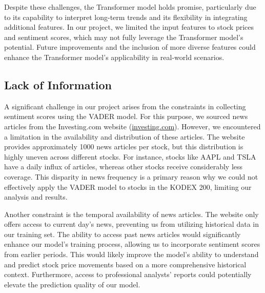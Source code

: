 Despite these challenges, the Transformer model holds promise, particularly due to its capability to interpret long-term trends and its flexibility in integrating additional features. 
In our project, we limited the input features to stock prices and sentiment scores, which may not fully leverage the Transformer model's potential. 
Future improvements and the inclusion of more diverse features could enhance the Transformer model's applicability in real-world scenarios.

\subsection{Lack of Information}

A significant challenge in our project arises from the constraints in collecting sentiment scores using the VADER model. 
For this purpose, we sourced news articles from the Investing.com website (\url{investing.com}). However, we encountered a limitation in the availability and distribution of these articles. 
The website provides approximately 1000 news articles per stock, but this distribution is highly uneven across different stocks. For instance, stocks like AAPL and TSLA have a daily influx of articles, whereas other stocks receive considerably less coverage. 
This disparity in news frequency is a primary reason why we could not effectively apply the VADER model to stocks in the KODEX 200, limiting our analysis and results.

Another constraint is the temporal availability of news articles. The website only offers access to current day's news, preventing us from utilizing historical data in our training set. 
The ability to access past news articles would significantly enhance our model's training process, allowing us to incorporate sentiment scores from earlier periods. 
This would likely improve the model's ability to understand and predict stock price movements based on a more comprehensive historical context.
Furthermore, access to professional analysts' reports could potentially elevate the prediction quality of our model. 
